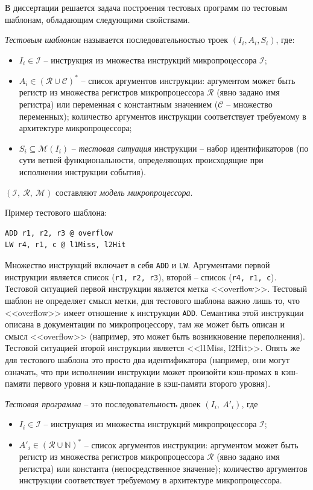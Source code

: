 В диссертации решается задача построения тестовых программ по
тестовым шаблонам, обладающим следующими свойствами.

\emph{Тестовым шаблоном} называется последовательностью троек $(I_i,
A_i, S_i)$, где:
\begin{itemize}
  \item $I_i \in \mathcal{I}$ -- инструкция из множества инструкций
микропроцессора $\mathcal{I}$;
  \item $A_i \in (\mathcal{R} \cup \mathcal{C})^*$ -- список аргументов
  инструкции: аргументом может быть регистр из множества регистров
  микропроцессора $\mathcal{R}$ (явно задано имя регистра) или
  переменная с константным значением ($\mathcal{C}$ -- множество
  переменных); количество аргументов инструкции соответствует
  требуемому в архитектуре микропроцессора;
  \item $S_i \subseteq \mathcal{M}(I_i)$ -- \emph{тестовая ситуация} инструкции -- набор идентификаторов (по сути ветвей функциональности, определяющих происходящие при исполнении инструкции события).
\end{itemize}

$(\mathcal{I},~\mathcal{R},~\mathcal{M})$ составляют \emph{модель микропроцессора}.

Пример тестового шаблона:
\begin{verbatim}
ADD r1, r2, r3 @ overflow
LW r4, r1, c @ l1Miss, l2Hit
\end{verbatim}
Множество инструкций включает в себя \texttt{ADD} и \texttt{LW}.
Аргументами первой инструкции является список (\texttt{r1, r2, r3}),
второй -- список (\texttt{r4, r1, c}). Тестовой ситуацией первой
инструкции является метка <<overflow>>. Тестовый шаблон не определяет смысл метки, для тестового шаблона важно лишь то, что <<overflow>> имеет отношение к инструкции \texttt{ADD}. Семантика этой инструкции описана в документации по микропроцессору, там же может быть описан и смысл <<overflow>> (например, это может быть возникновение переполнения).
Тестовой ситуацией второй инструкции является <<l1Miss, l2Hit>>. Опять же для тестового шаблона это просто два идентификатора (например, они могут означать, что при исполнении инструкции может произойти кэш-промах в кэш-памяти первого уровня и кэш-попадание в кэш-памяти второго уровня).

\emph{Тестовая программа} -- это последовательность двоек $(I_i,~A'_i)$, где
\begin{itemize}
  \item $I_i \in \mathcal{I}$ -- инструкция из множества инструкций
микропроцессора $\mathcal{I}$;
  \item $A'_i \in (\mathcal{R} \cup \mathds{N})^*$ -- список
  аргументов инструкции: аргументом может быть регистр из множества
  регистров микропроцессора $\mathcal{R}$ (явно задано имя регистра)
  или константа (непосредственное значение); количество аргументов
  инструкции соответствует требуемому в архитектуре микропроцессора.
\end{itemize}


